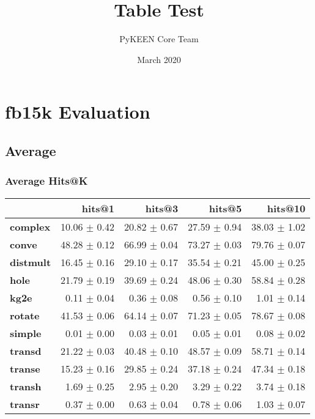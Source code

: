 \documentclass{article}
\title{Table Test}
\author{PyKEEN Core Team}
\date{March 2020}
\begin{document}
\section{fb15k Evaluation}
    \subsection{Average}
    \subsubsection{Average Hits@K}
    \begin{center}
    \begin{tabular}{lrrrr}
\toprule
{} &        hits@1 &        hits@3 &        hits@5 &       hits@10 \\
\midrule
\textbf{complex } &  10.06 $\pm$ 0.42 &  20.82 $\pm$ 0.67 &  27.59 $\pm$ 0.94 &  38.03 $\pm$ 1.02 \\
\textbf{conve   } &  48.28 $\pm$ 0.12 &  66.99 $\pm$ 0.04 &  73.27 $\pm$ 0.03 &  79.76 $\pm$ 0.07 \\
\textbf{distmult} &  16.45 $\pm$ 0.16 &  29.10 $\pm$ 0.17 &  35.54 $\pm$ 0.21 &  45.00 $\pm$ 0.25 \\
\textbf{hole    } &  21.79 $\pm$ 0.19 &  39.69 $\pm$ 0.24 &  48.06 $\pm$ 0.30 &  58.84 $\pm$ 0.28 \\
\textbf{kg2e    } &   0.11 $\pm$ 0.04 &   0.36 $\pm$ 0.08 &   0.56 $\pm$ 0.10 &   1.01 $\pm$ 0.14 \\
\textbf{rotate  } &  41.53 $\pm$ 0.06 &  64.14 $\pm$ 0.07 &  71.23 $\pm$ 0.05 &  78.67 $\pm$ 0.08 \\
\textbf{simple  } &   0.01 $\pm$ 0.00 &   0.03 $\pm$ 0.01 &   0.05 $\pm$ 0.01 &   0.08 $\pm$ 0.02 \\
\textbf{transd  } &  21.22 $\pm$ 0.03 &  40.48 $\pm$ 0.10 &  48.57 $\pm$ 0.09 &  58.71 $\pm$ 0.14 \\
\textbf{transe  } &  15.23 $\pm$ 0.16 &  29.85 $\pm$ 0.24 &  37.18 $\pm$ 0.24 &  47.34 $\pm$ 0.18 \\
\textbf{transh  } &   1.69 $\pm$ 0.25 &   2.95 $\pm$ 0.20 &   3.29 $\pm$ 0.22 &   3.74 $\pm$ 0.18 \\
\textbf{transr  } &   0.37 $\pm$ 0.00 &   0.63 $\pm$ 0.04 &   0.78 $\pm$ 0.06 &   1.03 $\pm$ 0.07 \\
\bottomrule
\end{tabular}

    \end{center}
\end{document}
